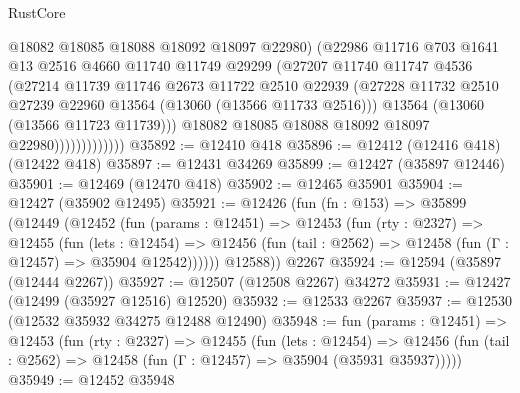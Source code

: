 \begin{lexlean}{RustCore}
\begin{coremodule}
                            @18082
                            @18085
                            @18088
                            @18092
                            @18097
                            @22980)
                          (@22986
                            @11716
                            @703
                            @1641
                            @13
                            @2516
                            @4660
                            @11740
                            @11749
                            @29299
                            (@27207
                              @11740
                              @11747
                              @4536
                              (@27214
                                @11739
                                @11746
                                @2673
                                @11722
                                @2510
                                @22939
                                (@27228
                                  @11732
                                  @2510
                                  @27239
                                  @22960
                                  @13564
                                  (@13060 (@13566 @11733 @2516)))
                                @13564
                                (@13060 (@13566 @11723 @11739)))
                              @18082
                              @18085
                              @18088
                              @18092
                              @18097
                              @22980)))))))))))))
@35892 := @12410 @418
@35896 := @12412 (@12416 @418) (@12422 @418)
@35897 := @12431 @34269
@35899 := @12427 (@35897 @12446)
@35901 := @12469 (@12470 @418)
@35902 := @12465 @35901
@35904 := @12427 (@35902 @12495)
@35921 := @12426
    (fun (fn : @153) =>
    @35899
      (@12449
        (@12452
          (fun (params : @12451) =>
          @12453
            (fun (rty : @2327) =>
            @12455
              (fun (lets : @12454) =>
              @12456 (fun (tail : @2562) => @12458 (fun (Γ : @12457) => @35904 @12542))))))
        @12588))
    @2267
@35924 := @12594 (@35897 (@12444 @2267))
@35927 := @12507 (@12508 @2267) @34272
@35931 := @12427 (@12499 (@35927 @12516) @12520)
@35932 := @12533 @2267
@35937 := @12530 (@12532 @35932 @34275 @12488 @12490)
@35948 := fun (params : @12451) =>
  @12453
    (fun (rty : @2327) =>
    @12455
      (fun (lets : @12454) =>
      @12456 (fun (tail : @2562) => @12458 (fun (Γ : @12457) => @35904 (@35931 @35937)))))
@35949 := @12452 @35948

\end{coremodule}
\end{lexlean}
